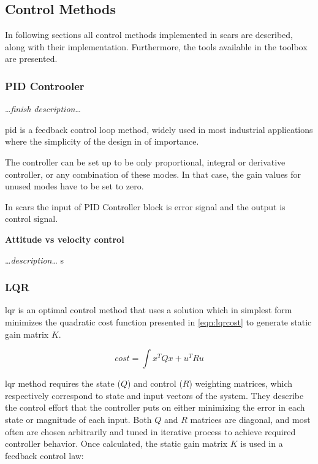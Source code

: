 \subsection{Control Methods}\label{sec:control}
    In following sections all control methods implemented in \ac{scars} are described, along with their implementation. Furthermore, the tools available in the toolbox are presented. 
    
    \subsubsection{PID Controoler}
        \dots\textit{finish description}\dots

        \ac{pid} is a feedback control loop method, widely used in most industrial applications where the simplicity of the design in of importance. 

        The controller can be set up to be only proportional, integral or derivative controller, or any combination of these modes. In that case, the gain values for unused modes have to be set to zero.

        In \ac{scars} the input of PID Controller block is error signal and the output is control signal.
        
        \textbf{Attitude vs velocity control}

            \dots\textit{description}\dots
    s
    \subsubsection{LQR}\label{sec:lqr}
        \ac{lqr} is an optimal control method that uses a solution which in simplest form minimizes the quadratic cost function presented in \autoref{eqn:lqrcost} to generate static gain matrix $K$.

        \begin{equation}
            cost = \int{x^TQx+u^TRu}
        \end{equation}\label{eqn:lqrcost}
        
        \ac{lqr} method requires the state ($Q$) and control ($R$) weighting matrices, which respectively correspond to state and input vectors of the system. They describe the control effort that the controller puts on either minimizing the error in each state or magnitude of each input. Both $Q$ and $R$ matrices are diagonal, and most often are chosen arbitrarily and tuned in iterative process to achieve required controller behavior. Once calculated, the static gain matrix $K$ is used in a feedback control law:

